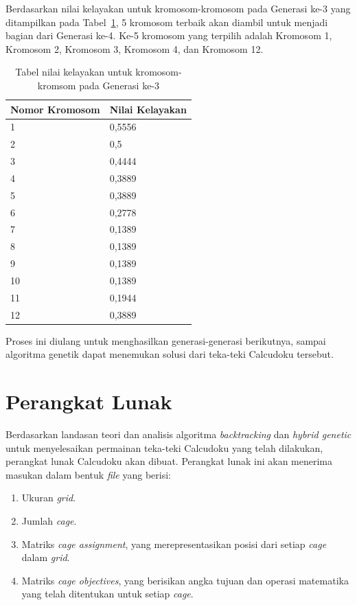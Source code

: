 \clearpage

Berdasarkan nilai kelayakan untuk kromosom-kromosom pada Generasi ke-3 yang ditampilkan pada Tabel~\ref{tab:analisishg4}, 5 kromosom terbaik akan diambil untuk menjadi bagian dari Generasi ke-4. Ke-5 kromosom yang terpilih adalah Kromosom 1, Kromosom 2, Kromosom 3, Kromosom 4, dan Kromosom 12.

\begin{table}
\centering
\captionsetup{justification=centering}
\caption[Tabel nilai kelayakan untuk kromosom-kromsom pada Generasi ke-3]{Tabel nilai kelayakan untuk kromosom-kromsom pada Generasi ke-3}
\begin{tabular}{| l | l |}
\hline
Nomor Kromosom & Nilai Kelayakan \\
\hline \hline
1 & 0,5556 \\
\hline
2 & 0,5 \\
\hline
3 & 0,4444 \\
\hline
4 & 0,3889 \\
\hline
5 & 0,3889 \\
\hline
6 & 0,2778 \\
\hline
7 & 0,1389 \\
\hline
8 & 0,1389 \\
\hline
9 & 0,1389 \\
\hline
10 & 0,1389 \\
\hline
11 & 0,1944 \\
\hline
12 & 0,3889 \\
\hline
\end{tabular}
\label{tab:analisishg4}
\end{table}

Proses ini diulang untuk menghasilkan generasi-generasi berikutnya, sampai algoritma genetik dapat menemukan solusi dari teka-teki Calcudoku tersebut.

\section{Perangkat Lunak}
\label{sec:analisispl}

Berdasarkan landasan teori dan analisis algoritma \textit{backtracking} dan \textit{hybrid genetic} untuk menyelesaikan permainan teka-teki Calcudoku yang telah dilakukan, perangkat lunak Calcudoku akan dibuat. Perangkat lunak ini akan menerima masukan dalam bentuk \textit{file} yang berisi:

\begin{enumerate}
\item Ukuran \textit{grid}.
\item Jumlah \textit{cage}.
\item Matriks \textit{cage assignment}, yang merepresentasikan posisi dari setiap \textit{cage} dalam \textit{grid}.
\item Matriks \textit{cage objectives}, yang berisikan angka tujuan dan operasi matematika yang telah ditentukan untuk setiap \textit{cage}.
\end{enumerate}

